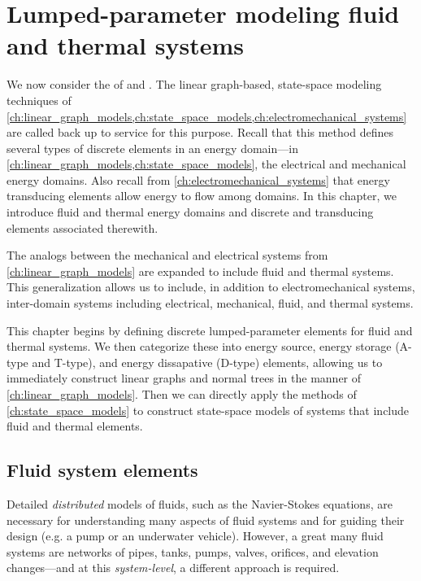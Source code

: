 \documentclass[dynamic_systems.tex]{subfiles}
\begin{document}
\chapter[Fluid and thermal systems]{Lumped-parameter modeling fluid and thermal systems}
\tags{}

We now consider the  of  and .
The linear graph-based, state-space modeling techniques of \cref{ch:linear_graph_models,ch:state_space_models,ch:electromechanical_systems} are called back up to service for this purpose.
Recall that this method defines several types of discrete elements in an energy domain---in \cref{ch:linear_graph_models,ch:state_space_models}, the electrical and mechanical energy domains.
Also recall from \cref{ch:electromechanical_systems} that energy transducing elements allow energy to flow among domains.
In this chapter, we introduce fluid and thermal energy domains and discrete and transducing elements associated therewith.
\tags{}

The analogs between the mechanical and electrical systems from \cref{ch:linear_graph_models} are expanded to include fluid and thermal systems.
This generalization allows us to include, in addition to electromechanical systems, inter-domain systems including electrical, mechanical, fluid, and thermal systems.
\tags{}

This chapter begins by defining discrete lumped-parameter elements for fluid and thermal systems.
We then categorize these into energy source, energy storage (A-type and T-type), and energy dissapative (D-type) elements, allowing us to immediately construct linear graphs and normal trees in the manner of \cref{ch:linear_graph_models}.
Then we can directly apply the methods of \cref{ch:state_space_models} to construct state-space models of systems that include fluid and thermal elements.

\section{Fluid system elements}
\tags{}

Detailed \emph{distributed} models of fluids, such as the Navier-Stokes equations, are necessary for understanding many aspects of fluid systems and for guiding their design (e.g. a pump or an underwater vehicle).
However, a great many fluid systems are networks of pipes, tanks, pumps, valves, orifices, and elevation changes---and at this \emph{system-level}, a different approach is required.
\tags{}
\end{document}
